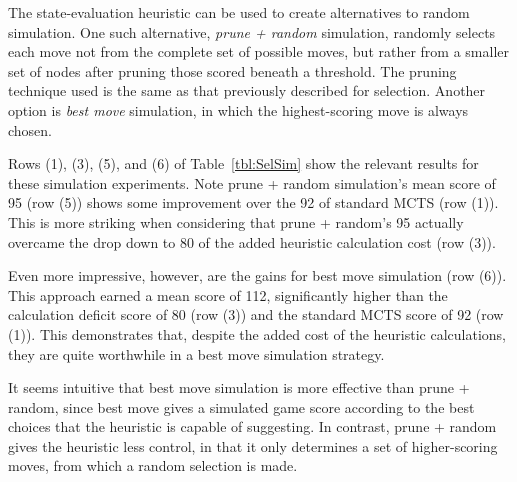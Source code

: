\documentclass[letterpaper]{article}
\begin{document}

The state-evaluation heuristic can be used to create alternatives to random simulation. One such alternative, {\it prune + random} simulation, randomly selects each move not from the complete set of possible moves, but rather from a smaller set of nodes after pruning those scored beneath a threshold. The pruning technique used is the same as that previously described for selection. Another option is {\it best move} simulation, in which the highest-scoring move is always chosen.

Rows (1), (3), (5), and (6) of Table~\ref{tbl:SelSim} show the relevant results for these simulation experiments. Note prune + random simulation's mean score of 95 (row (5)) shows some improvement over the 92 of standard MCTS (row (1)). This is more striking when considering that prune + random's 95 actually overcame the drop down to 80 of the added heuristic calculation cost (row (3)).

Even more impressive, however, are the gains for best move simulation (row (6)). This approach earned a mean score of 112, significantly higher than the calculation deficit score of 80 (row (3)) and the standard MCTS score of 92 (row (1)). This demonstrates that, despite the added cost of the heuristic calculations, they are quite worthwhile in a best move simulation strategy.

It seems intuitive that best move simulation is more effective than prune + random, since best move gives a simulated game score according to the best choices that the heuristic is capable of suggesting. In contrast, prune + random gives the heuristic less control, in that it only determines a set of higher-scoring moves, from which a random selection is made.

\end{document}
